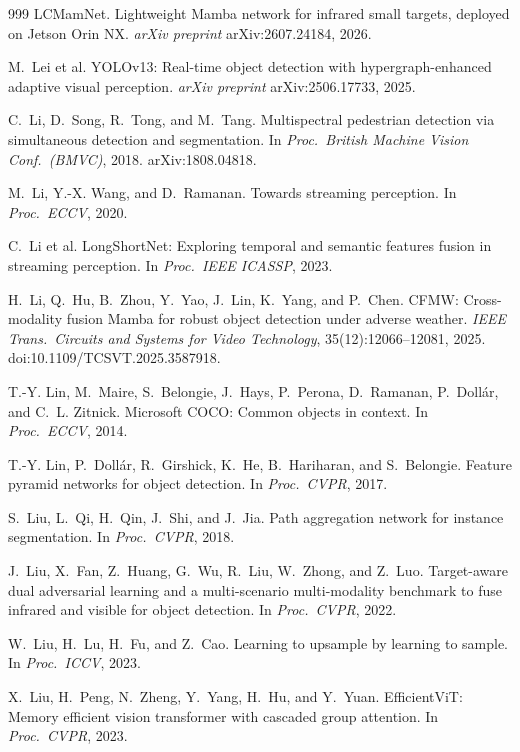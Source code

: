 \begin{thebibliography}{999}
LCMamNet. Lightweight Mamba network for infrared small targets, deployed on
Jetson Orin NX. \textit{arXiv preprint} arXiv:2607.24184, 2026.

M.~Lei et al.
YOLOv13: Real-time object detection with hypergraph-enhanced adaptive visual
perception. \textit{arXiv preprint} arXiv:2506.17733, 2025.

C.~Li, D.~Song, R.~Tong, and M.~Tang.
Multispectral pedestrian detection via simultaneous detection and segmentation.
In \textit{Proc.\ British Machine Vision Conf.\ (BMVC)}, 2018. arXiv:1808.04818.

M.~Li, Y.-X. Wang, and D.~Ramanan.
Towards streaming perception.
In \textit{Proc.\ ECCV}, 2020.

C.~Li et al.
LongShortNet: Exploring temporal and semantic features fusion in streaming
perception. In \textit{Proc.\ IEEE ICASSP}, 2023.

H.~Li, Q.~Hu, B.~Zhou, Y.~Yao, J.~Lin, K.~Yang, and P.~Chen.
CFMW: Cross-modality fusion Mamba for robust object detection under adverse
weather. \textit{IEEE Trans.\ Circuits and Systems for Video Technology},
35(12):12066--12081, 2025. doi:10.1109/TCSVT.2025.3587918.

T.-Y. Lin, M.~Maire, S.~Belongie, J.~Hays, P.~Perona, D.~Ramanan, P.~Doll\'ar,
and C.~L. Zitnick.
Microsoft COCO: Common objects in context.
In \textit{Proc.\ ECCV}, 2014.

T.-Y. Lin, P.~Doll\'ar, R.~Girshick, K.~He, B.~Hariharan, and S.~Belongie.
Feature pyramid networks for object detection.
In \textit{Proc.\ CVPR}, 2017.

S.~Liu, L.~Qi, H.~Qin, J.~Shi, and J.~Jia.
Path aggregation network for instance segmentation.
In \textit{Proc.\ CVPR}, 2018.

J.~Liu, X.~Fan, Z.~Huang, G.~Wu, R.~Liu, W.~Zhong, and Z.~Luo.
Target-aware dual adversarial learning and a multi-scenario multi-modality
benchmark to fuse infrared and visible for object detection.
In \textit{Proc.\ CVPR}, 2022.

W.~Liu, H.~Lu, H.~Fu, and Z.~Cao.
Learning to upsample by learning to sample.
In \textit{Proc.\ ICCV}, 2023.

X.~Liu, H.~Peng, N.~Zheng, Y.~Yang, H.~Hu, and Y.~Yuan.
EfficientViT: Memory efficient vision transformer with cascaded group attention.
In \textit{Proc.\ CVPR}, 2023.


\end{thebibliography}
